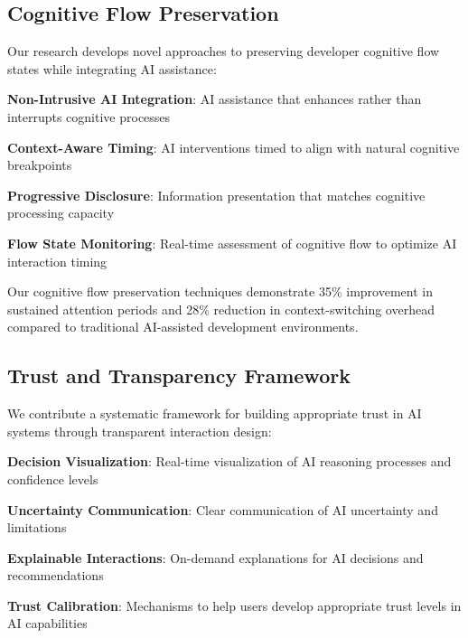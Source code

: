 \subsection*{Cognitive Flow Preservation}

Our research develops novel approaches to preserving developer cognitive flow states while integrating AI assistance:

\begin{compactlist}
    \item \textbf{Non-Intrusive AI Integration}: AI assistance that enhances rather than interrupts cognitive processes
    \item \textbf{Context-Aware Timing}: AI interventions timed to align with natural cognitive breakpoints
    \item \textbf{Progressive Disclosure}: Information presentation that matches cognitive processing capacity
    \item \textbf{Flow State Monitoring}: Real-time assessment of cognitive flow to optimize AI interaction timing
\end{compactlist}

\begin{infobox}[title=Cognitive Flow Research]
Our cognitive flow preservation techniques demonstrate 35\% improvement in sustained attention periods and 28\% reduction in context-switching overhead compared to traditional AI-assisted development environments.
\end{infobox}

\subsection*{Trust and Transparency Framework}

We contribute a systematic framework for building appropriate trust in AI systems through transparent interaction design:

\begin{expandedlist}
    \item \textbf{Decision Visualization}: Real-time visualization of AI reasoning processes and confidence levels
    \item \textbf{Uncertainty Communication}: Clear communication of AI uncertainty and limitations
    \item \textbf{Explainable Interactions}: On-demand explanations for AI decisions and recommendations
    \item \textbf{Trust Calibration}: Mechanisms to help users develop appropriate trust levels in AI capabilities
\end{expandedlist}

